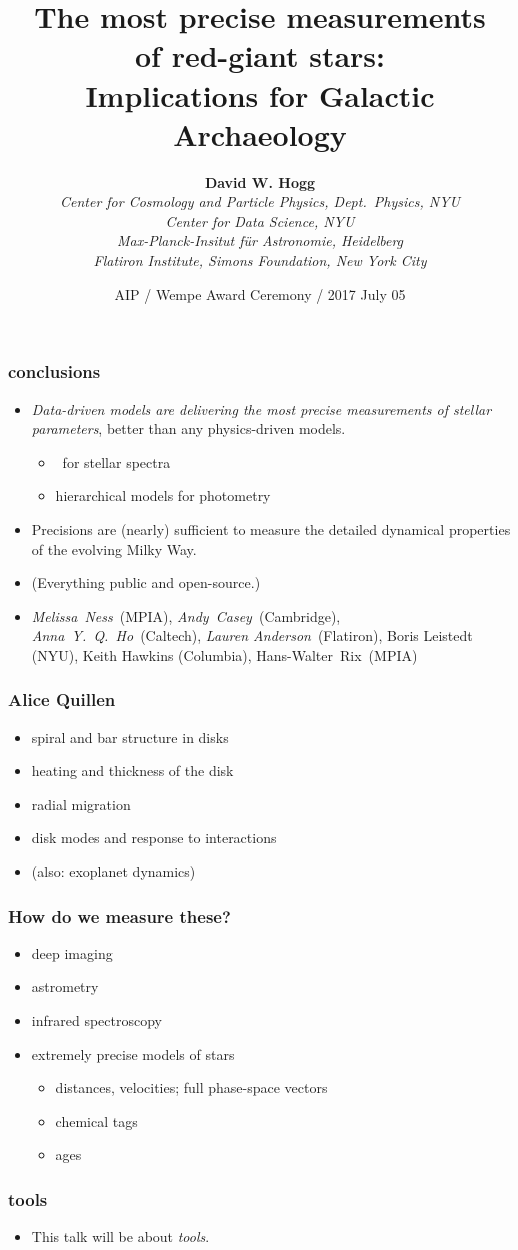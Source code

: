 \documentclass[pdftex]{beamer}
\title{The most precise measurements\\ of red-giant stars:\\
       Implications for Galactic Archaeology}
\author[David W. Hogg (NYU)]{\textbf{David W. Hogg} \\
  \textsl{\footnotesize Center for Cosmology and Particle Physics, Dept.~Physics, NYU} \\
  \textsl{\footnotesize Center for Data Science, NYU} \\
  \textsl{\footnotesize Max-Planck-Insitut f\"ur Astronomie, Heidelberg} \\
  \textsl{\footnotesize Flatiron Institute, Simons Foundation, New York City}}
\date{AIP / Wempe Award Ceremony / 2017 July 05}
\newcommand{\conclusions}{%
\begin{frame}
  \frametitle{conclusions}
  \begin{itemize}
  \item \emph{Data-driven models are delivering the most precise measurements
    of stellar parameters}, better than any physics-driven models.
    \begin{itemize}
    \item \tc\ for stellar spectra
    \item hierarchical models for photometry
    \end{itemize}
  \item Precisions are (nearly) sufficient to measure the
    detailed dynamical properties of the evolving Milky Way.
  \item (Everything public and open-source.)
  \item \emph{Melissa~Ness}~(MPIA), \emph{Andy~Casey}~(Cambridge), \emph{Anna~Y.~Q.~Ho}~(Caltech), \emph{Lauren Anderson}~(Flatiron), Boris Leistedt (NYU), Keith Hawkins (Columbia), Hans-Walter~Rix~(MPIA)
  \end{itemize}
\end{frame}}
\begin{document}
\sloppy\sloppypar\raggedright\raggedbottom

\begin{frame}
  \titlepage
\end{frame}

\conclusions

\begin{frame}
  \frametitle{Alice Quillen}
  \begin{itemize}
  \item spiral and bar structure in disks
  \item heating and thickness of the disk
  \item radial migration
  \item disk modes and response to interactions
  \item (also: exoplanet dynamics)
  \end{itemize}
\end{frame}

\begin{frame}
  \frametitle{How do we measure these?}
  \begin{itemize}
  \item deep imaging
  \item astrometry
  \item infrared spectroscopy
  \item extremely precise models of stars
    \begin{itemize}
    \item distances, velocities; full phase-space vectors
    \item chemical tags
    \item ages
    \end{itemize}
  \end{itemize}
\end{frame}

\begin{frame}
  \frametitle{tools}
  \begin{itemize}
  \item This talk will be about \emph{tools}.
  \end{itemize}
\end{frame}
\end{document}
